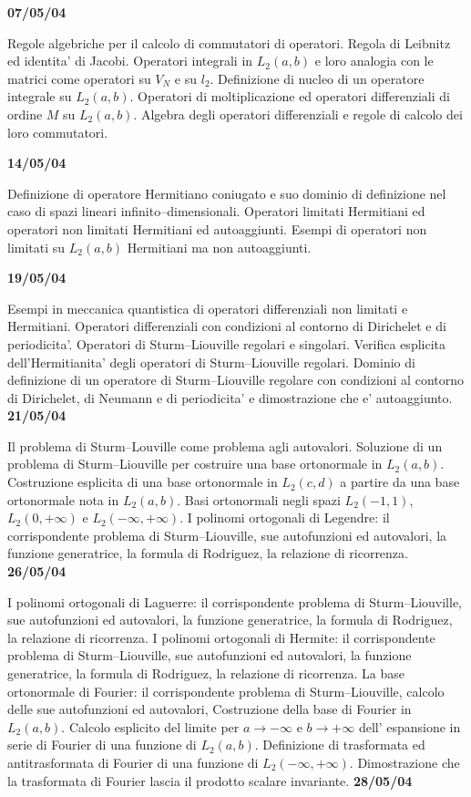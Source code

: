 \documentclass[a4paper,10pt]{article}
\begin{document}
\vskip 12pt
\noindent
\textbf{07/05/04}

\noindent
Regole algebriche per il calcolo di commutatori di operatori. Regola di Leibnitz ed identita' di Jacobi. Operatori integrali in $L_2(a,b)$ e loro analogia con le matrici come operatori su $V_N$ e su $l_2$. Definizione di nucleo di un operatore integrale su $L_2(a,b)$. Operatori di moltiplicazione ed operatori differenziali di ordine $M$ su $L_2(a,b)$. Algebra degli operatori differenziali e regole di calcolo dei loro commutatori. 



\vskip 12pt
\noindent
\textbf{14/05/04}

\noindent 
Definizione di operatore Hermitiano coniugato e suo dominio di definizione nel caso di spazi lineari infinito--dimensionali. Operatori limitati Hermitiani ed operatori non limitati Hermitiani ed autoaggiunti. Esempi di operatori non limitati su $L_2(a,b)$  Hermitiani ma non autoaggiunti.
 

\vskip 12pt
\noindent
\textbf{19/05/04}

\noindent 
Esempi in meccanica quantistica di operatori differenziali non limitati e Hermitiani. Operatori differenziali con condizioni al contorno di Dirichelet e di periodicita'. Operatori di Sturm--Liouville regolari e singolari.
Verifica esplicita dell'Hermitianita' degli operatori di Sturm--Liouville regolari. Dominio di definizione di un operatore di Sturm--Liouville regolare con condizioni al contorno di Dirichelet, di Neumann e di periodicita' e dimostrazione che e' autoaggiunto.
\vskip 12pt
\noindent
\textbf{21/05/04}

\noindent 
Il problema di Sturm--Louville come problema agli autovalori. Soluzione di un problema di Sturm--Liouville per costruire una base ortonormale in $L_2(a,b)$. Costruzione esplicita di una base ortonormale in $L_2(c,d)$ a partire da una base ortonormale nota in $L_2(a,b)$. Basi ortonormali negli spazi $L_2(-1,1)$, $L_2(0,+\infty)$ e $L_2(-\infty,+\infty)$. I polinomi ortogonali di Legendre: il corrispondente problema di Sturm--Liouville, sue autofunzioni ed autovalori, la funzione generatrice, la formula di Rodriguez, la relazione di ricorrenza.
\vskip 12pt
\noindent
\textbf{26/05/04}

\noindent 
I polinomi ortogonali di Laguerre: il corrispondente problema di Sturm--Liouville, sue autofunzioni ed autovalori, la funzione generatrice, la formula di Rodriguez, la relazione di ricorrenza. I polinomi ortogonali di Hermite: il corrispondente problema di Sturm--Liouville, sue autofunzioni ed autovalori, la funzione generatrice, la formula di Rodriguez, la relazione di ricorrenza.  La base ortonormale di Fourier: il corrispondente problema di Sturm--Liouville, calcolo delle sue autofunzioni ed autovalori, Costruzione della base di Fourier in $L_2(a,b)$. Calcolo esplicito del limite per $a\rightarrow -\infty$ e $b\rightarrow +\infty$ dell' espansione in serie di Fourier di una funzione di $L_2(a,b)$. Definizione di trasformata ed antitrasformata di Fourier di una funzione di $L_2(-\infty,+\infty)$. Dimostrazione che la trasformata di Fourier lascia il prodotto scalare invariante. 
\vskip 12pt
\noindent
\textbf{28/05/04}
\end{document}
